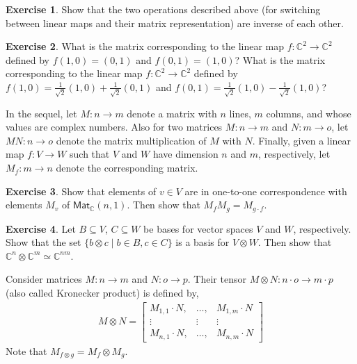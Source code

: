 \documentclass[a4paper, 11pt]{article}
\newcommand{\complex}{\mathbb{C}}
\theoremstyle{definition}
\newtheorem{exercise}{Exercise}
\begin{document}
\begin{exercise}
  Show that the two operations described above (for switching between
  linear maps and their matrix representation) are inverse of each
  other.
\end{exercise}

\begin{exercise}
  What is the matrix corresponding to the linear map
  $f : \complex^2 \to \complex^2$ defined by $f(1,0) = (0,1)$ and
  $f(0,1) = (1,0)$? What is the matrix corresponding to the linear map
  $f : \complex^2 \to \complex^2$ defined by
  $f(1,0) = \frac{1}{\sqrt{2}}(1,0) + \frac{1}{\sqrt{2}}(0,1)$ and
  $f(0,1) = \frac{1}{\sqrt{2}}(1,0) - \frac{1}{\sqrt{2}}(1,0)$?
\end{exercise}

In the sequel, let $M : n \to m$ denote a matrix with $n$ lines, $m$
columns, and whose values are complex numbers. Also for two matrices
$M : n \to m$ and $N : m \to o$, let $M N : n  \to  o$
denote the matrix multiplication of $M$ with $N$. Finally, given a
linear map $f : V \to W$ such that $V$ and $W$ have dimension $n$ and
$m$, respectively, let $M_f : m \to n$ denote the corresponding matrix.
  
\begin{exercise}
  Show that elements of $v \in V$ are in one-to-one correspondence
  with elements $M_v$ of $\mathsf{Mat}_\complex(n,1)$. Then show that
  $M_f M_g = M_{g \cdot f}$.
\end{exercise}


\begin{exercise}
  Let $B \subseteq V$, $C \subseteq W$ be bases for vector spaces $V$
  and $W$, respectively.  Show that the set
  $\{ b \otimes c \mid b \in B, c \in C \}$ is a basis for
  $V \otimes W$. Then show that
  $\complex^n \otimes \complex^m \simeq \complex^{n m}$.
\end{exercise}

Consider matrices $M : n \to m$ and $N : o \to p$. Their tensor
$M \otimes N : n \cdot o \to m \cdot p$ (also called Kronecker
product) is defined by,
\begin{align*}
  M \otimes N =
  \begin{bmatrix}
    M_{1,1} \cdot N, & \dots, &  M_{1,m} \cdot N \\
    \vdots & \vdots & \vdots \\
    M_{n,1} \cdot N, & \dots, &  M_{n,m} \cdot N
  \end{bmatrix}
\end{align*}
Note that $M_{f \otimes g} = M_f \otimes M_g$.
\end{document}
